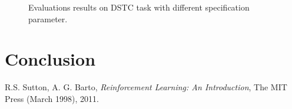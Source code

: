 \documentclass[10pt,a4paper]{article}
\begin{document}
\begin{figure}[!htb]
%
\endminipage 
{}  
\endminipage\hfill
  \caption[1]{Evaluations results on DSTC task with different specification parameter.}
\end{figure}

\section{Conclusion}


\begin{thebibliography}{15}
 R.S. Sutton, A. G. Barto, \emph{Reinforcement Learning: An Introduction}, The MIT Press (March 1998), 2011.


\end{thebibliography}
\end{document}

